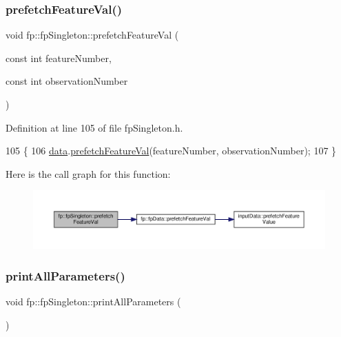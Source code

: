 \subsubsection{\texorpdfstring{prefetch\+Feature\+Val()}{prefetchFeatureVal()}}
{\footnotesize\ttfamily void fp\+::fp\+Singleton\+::prefetch\+Feature\+Val (\begin{DoxyParamCaption}\item[{const int}]{feature\+Number,  }\item[{const int}]{observation\+Number }\end{DoxyParamCaption})\hspace{0.3cm}{\ttfamily [inline]}}



Definition at line 105 of file fp\+Singleton.\+h.


\begin{DoxyCode}
105                                                                                     \{
106                 \hyperlink{classfp_1_1fpSingleton_a2fa16ac6a0f66641749032eeee61b8e9}{data}.\hyperlink{classfp_1_1fpData_a3f9645ca93e9b64a788b3042e9e41fcc}{prefetchFeatureVal}(featureNumber, observationNumber);
107             \}
\end{DoxyCode}
Here is the call graph for this function\+:\nopagebreak
\begin{figure}[H]
\begin{center}
\leavevmode
\includegraphics[width=350pt]{classfp_1_1fpSingleton_ab789c4e4bfb3248711a5857015008f8d_cgraph}
\end{center}
\end{figure}
\mbox{\label{classfp_1_1fpSingleton_a0d769b6652e4c74c2734cdc811eeab5a}} 
\subsubsection{\texorpdfstring{print\+All\+Parameters()}{printAllParameters()}}
{\footnotesize\ttfamily void fp\+::fp\+Singleton\+::print\+All\+Parameters (\begin{DoxyParamCaption}{ }\end{DoxyParamCaption})\hspace{0.3cm}{\ttfamily [inline]}}



